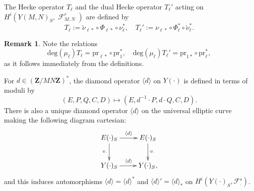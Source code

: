 \documentclass[10pt,letterpaper]{amsart}
\theoremstyle{plain}
\theoremstyle{definition}
\newtheorem{rmk}[thm]{Remark}
\theoremstyle{definition}
\theoremstyle{plain}
\theoremstyle{plain}
\theoremstyle{plain}
\theoremstyle{remark}
\numberwithin{equation}{section}
\DeclareMathOperator{\et}{\acute{e}t}
\DeclareMathOperator{\F}{\mathscr{F}}
\newcommand{\Z}{\mathbf{Z}}
\begin{document}
The Hecke operator $T_\ell$ and the dual Hecke operator $T_\ell'$ acting on $H^i_{\et}(Y(M,N)_S,\F_{M,N}^r)$ are defined  by
\begin{equation*}
T_\ell:=\check{\nu}_{\ell*}\circ\Phi_{\ell*}\circ\nu_\ell^{*},\quad T_\ell':=\nu_{\ell*}\circ\Phi_\ell^{*}\circ\check{\nu}_\ell^{*}.
\end{equation*}

\begin{rmk}
Note the relations
\begin{equation*}
   \text{deg}(\mu_\ell) T_\ell=\text{pr}_{\ell*}\circ \text{pr}_1^{*},\quad\text{deg}(\mu_\ell)T_\ell'=\text{pr}_{1*}\circ\text{pr}_\ell^{*},
\end{equation*}
as it follows immediately from the definitions.
\end{rmk}


For $d\in (\Z/MN\Z)^{*}$, the diamond operator $\langle d\rangle$ on $Y(\cdot)$ is defined in terms of moduli by
\begin{equation*}
    (E,P,Q,C,D)\mapsto (E,d^{-1}\cdot P,d\cdot Q,C,D).
\end{equation*}
There is also a unique diamond operator $\langle d\rangle $ on the universal elliptic curve making the following diagram cartesian:
\begin{equation*}
    \xymatrix{
E(\cdot)_S \ar[d]_{v_{\cdot}} \ar[r]^{\langle d\rangle} & E(\cdot)_S \ar[d]^{v_{\cdot}} \\
Y(\cdot)_S \ar[r]^{\langle d\rangle} & Y(\cdot)_S,}
\end{equation*}
and this induces automorphisms $\langle d\rangle=\langle d\rangle^{*}$ and $\langle d\rangle'=\langle d\rangle_{*}$ on $H^i_{\et}(Y(\cdot)_S,\mathscr{F^r_{\cdot}})$.
\end{document}
